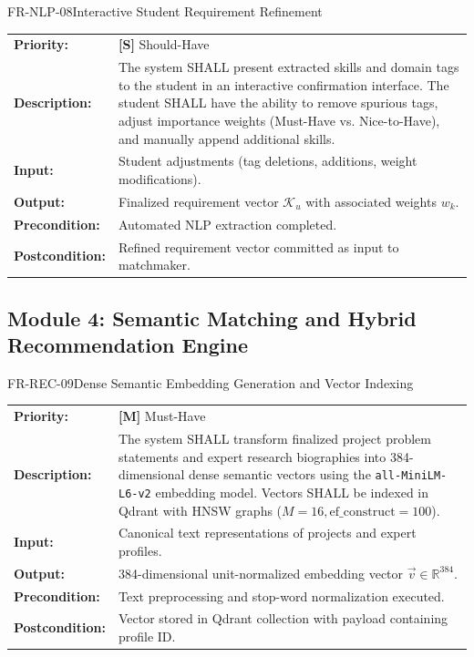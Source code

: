 \documentclass[11pt,a4paper]{article}
\begin{document}
\begin{reqbox}{FR-NLP-08}{Interactive Student Requirement Refinement}
\begin{tabularx}{\textwidth}{@{}lX@{}}
\textbf{Priority:} & \textbf{[S]} Should-Have \\
\textbf{Description:} & The system SHALL present extracted skills and domain tags to the student in an interactive confirmation interface. The student SHALL have the ability to remove spurious tags, adjust importance weights (Must-Have vs. Nice-to-Have), and manually append additional skills. \\
\textbf{Input:} & Student adjustments (tag deletions, additions, weight modifications). \\
\textbf{Output:} & Finalized requirement vector $\mathcal{K}_u$ with associated weights $w_k$. \\
\textbf{Precondition:} & Automated NLP extraction completed. \\
\textbf{Postcondition:} & Refined requirement vector committed as input to matchmaker. \\
\end{tabularx}
\end{reqbox}

\subsection{Module 4: Semantic Matching and Hybrid Recommendation Engine}

\begin{reqbox}{FR-REC-09}{Dense Semantic Embedding Generation and Vector Indexing}
\begin{tabularx}{\textwidth}{@{}lX@{}}
\textbf{Priority:} & \textbf{[M]} Must-Have \\
\textbf{Description:} & The system SHALL transform finalized project problem statements and expert research biographies into 384-dimensional dense semantic vectors using the \texttt{all-MiniLM-L6-v2} embedding model. Vectors SHALL be indexed in Qdrant with HNSW graphs ($M=16, \text{ef\_construct}=100$). \\
\textbf{Input:} & Canonical text representations of projects and expert profiles. \\
\textbf{Output:} & 384-dimensional unit-normalized embedding vector $\vec{v} \in \mathbb{R}^{384}$. \\
\textbf{Precondition:} & Text preprocessing and stop-word normalization executed. \\
\textbf{Postcondition:} & Vector stored in Qdrant collection with payload containing profile ID. \\
\end{tabularx}
\end{reqbox}
\end{document}

